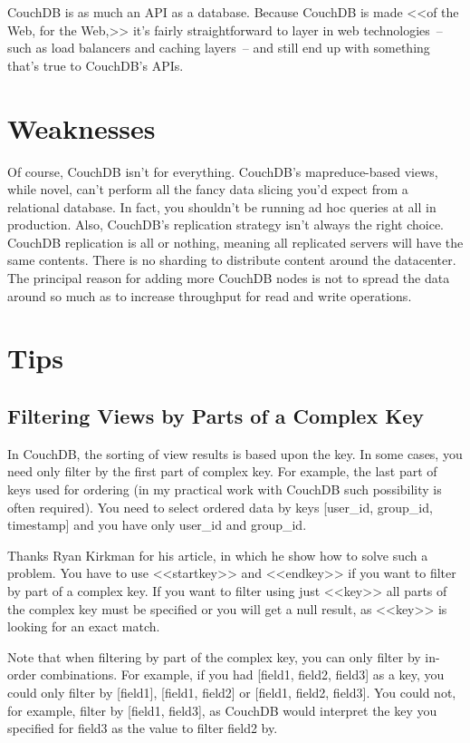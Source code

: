 CouchDB is as much an API as a database. Because CouchDB is made <<of the Web, for the Web,>> it’s fairly straightforward to layer in web technologies~-- such as load balancers and caching layers~-- and still end up with something that's true to CouchDB's APIs.\cite{seven_databases}

\section{Weaknesses}

Of course, CouchDB isn't for everything. CouchDB's mapreduce-based views, while novel, can't perform all the fancy data slicing you'd expect from a relational database. In fact, you shouldn't be running ad hoc queries at all in production. Also, CouchDB's replication strategy isn't always the right choice. CouchDB replication is all or nothing, meaning all replicated servers will have the same contents. There is no sharding to distribute content around the datacenter. The principal reason for adding more CouchDB nodes is not to spread the data around so much as to increase throughput for read and write operations.\cite{seven_databases}

\section{Tips}

\subsection{Filtering Views by Parts of a Complex Key}

In CouchDB, the sorting of view results is based upon the key. In some cases, you need only filter by the first part of complex key. For example, the last part of keys used for ordering (in my practical work with CouchDB such possibility is often required). You need to select ordered data by keys [user\_id, group\_id, timestamp] and you have only user\_id and group\_id.

Thanks Ryan Kirkman for his article\cite{couchdb_filtering_views}, in which he show how to solve such a problem. You have to use <<startkey>> and <<endkey>> if you want to filter by part of a complex key. If you want to filter using just <<key>> all parts of the complex key must be specified or you will get a null result, as <<key>> is looking for an exact match.

Note that when filtering by part of the complex key, you can only filter by in-order combinations. For example, if you had [field1, field2, field3] as a key, you could only filter by [field1], [field1, field2] or [field1, field2, field3]. You could not, for example, filter by [field1, field3], as CouchDB would interpret the key you specified for field3 as the value to filter field2 by.

